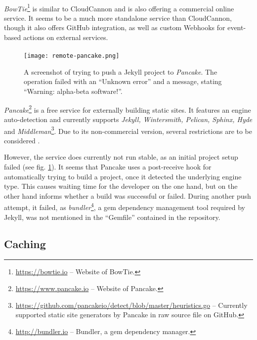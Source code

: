 \paragraph{}
\emph{BowTie}\footnote{\url{https://bowtie.io} -- Website of BowTie.} is similar to CloudCannon and is also offering a commercial online service. It seems to be a much more standalone service than CloudCannon, though it also offers GitHub integration, as well as custom Webhooks for event-based actions on external services.

\paragraph{}

\begin{figure} %
    \centering
    \texttt{[image: remote-pancake.png]}
    \caption{A screenshot of trying to push a Jekyll project to \emph{Pancake}. The operation failed with an ``Unknown error'' and a message, stating ``Warning: alpha-beta software!''.}
    \label{fig:remote-pancake}
\end{figure}
%
\emph{Pancake}\footnote{\url{https://www.pancake.io} -- Website of Pancake.} is a free service for externally building static sites. It features an engine auto-detection and currently supports \emph{Jekyll, Wintersmith, Pelican, Sphinx, Hyde} and \emph{Middleman}\footnote{\url{https://github.com/pancakeio/detect/blob/master/heuristics.go} -- Currently supported static site generators by Pancake in raw source file on GitHub.}. Due to its non-commercial version, several restrictions are to be considered \cite{PancakeGitProjects}.

However, the service does currently not run stable, as an initial project setup failed (see fig. \ref{fig:remote-pancake}). It seems that Pancake uses a post-receive hook for automatically trying to build a project, once it detected the underlying engine type. This causes waiting time for the developer on the one hand, but on the other hand informs whether a build was successful or failed. During another push attempt, it failed, as \emph{bundler}\footnote{\url{http://bundler.io} -- Bundler, a gem dependency manager.}, a gem dependency management tool required by Jekyll, was not mentioned in the ``Gemfile'' contained in the repository.


\subsection{Caching}
\label{sec:solutions-caching}

